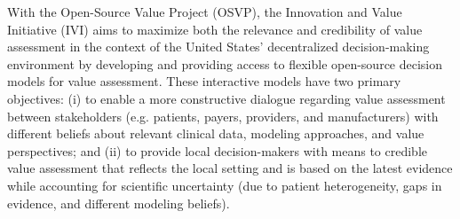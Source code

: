 \documentclass[11pt,final,fleqn]{article}\usepackage[]{graphicx}\usepackage[]{color}
\theoremstyle{plain}
\begin{document}
With the Open-Source Value Project (OSVP), the Innovation and Value Initiative (IVI) aims to maximize both the relevance and credibility of value assessment in the context of the United States' decentralized decision-making environment by developing and providing access to flexible open-source decision models for value assessment. These interactive models have two primary objectives: (i) to enable a more constructive dialogue regarding value assessment between stakeholders (e.g. patients, payers, providers, and manufacturers) with different beliefs about relevant clinical data, modeling approaches, and value perspectives; and (ii) to provide local decision-makers with means to credible value assessment that reflects the local setting and is based on the latest evidence while accounting for scientific uncertainty (due to patient heterogeneity, gaps in evidence, and different modeling beliefs). 
\end{document}
